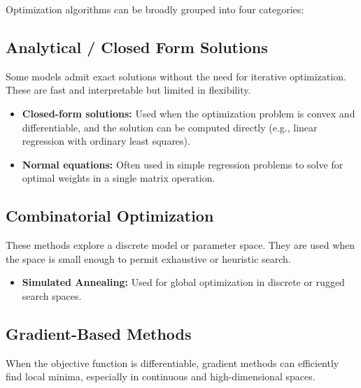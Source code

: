 \documentclass[12pt,openany, draft]{book}
\begin{document}
Optimization algorithms can be broadly grouped into four categories:

\subsection{Analytical / Closed Form Solutions}

Some models admit exact solutions without the need for iterative optimization. These are fast and interpretable but limited in flexibility.

\begin{itemize}
    \item \textbf{Closed-form solutions:} Used when the optimization problem is convex and differentiable, and the solution can be computed directly (e.g., linear regression with ordinary least squares).
    \item \textbf{Normal equations:} Often used in simple regression problems to solve for optimal weights in a single matrix operation.
\end{itemize}

\subsection{Combinatorial Optimization}

These methods explore a discrete model or parameter space. They are used when the space is small enough to permit exhaustive or heuristic search.

\begin{itemize}
    \item \textbf{Simulated Annealing:} Used for global optimization in discrete or rugged search spaces.
\end{itemize}

\subsection{Gradient-Based Methods}

When the objective function is differentiable, gradient methods can efficiently find local minima, especially in continuous and high-dimensional spaces.
\end{document}

